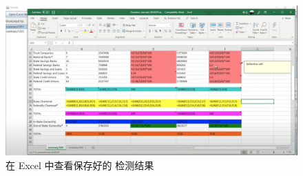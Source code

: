 \begin{figure}[tbp]    
    \centering
    \includegraphics[width=\textwidth]{figure/sg/sguard-8.png}
    \caption{在 Excel 中查看保存好的 \wa 检测结果}
    \label{figure-sg8}
\end{figure}